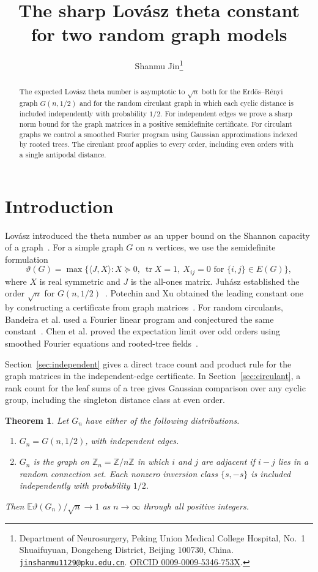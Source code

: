 \documentclass[11pt,letterpaper]{article}
\title{The sharp Lov\'asz theta constant for two random graph models}
\author{Shanmu Jin\thanks{Department of Neurosurgery, Peking Union Medical College
  Hospital, No.~1 Shuaifuyuan, Dongcheng District, Beijing
  100730, China.
  \href{mailto:jinshanmu1129@pku.edu.cn}{\nolinkurl{jinshanmu1129@pku.edu.cn}}.
  \href{https://orcid.org/0009-0009-5346-753X}{ORCID 0009-0009-5346-753X}.}}
\date{}
\newtheorem{theorem}{Theorem}
\newcommand{\E}{\mathbb E}
\newcommand{\Z}{\mathbb Z}
\newcommand{\tr}{\operatorname{tr}}
\begin{document}
\maketitle

\begin{abstract}
The expected Lov\'asz theta number is asymptotic to \(\sqrt n\) both for the
Erd\H{o}s--R\'enyi graph \(G(n,1/2)\) and for the random circulant graph in
which each cyclic distance is included independently with probability
\(1/2\). For independent edges we prove a sharp norm bound for the graph
matrices in a positive semidefinite certificate. For circulant graphs we
control a smoothed Fourier program using Gaussian approximations indexed
by rooted trees. The circulant proof applies to every order, including
even orders with a single antipodal distance.
\end{abstract}

\section{Introduction}

Lov\'asz introduced the theta number as an upper bound on the Shannon
capacity of a graph~\cite{Lovasz}. For a simple graph \(G\) on \(n\)
vertices, we use the semidefinite formulation
\begin{equation}\label{eq:theta}
 \vartheta(G)=\max\{\langle J,X\rangle : X\succeq0,\ \tr X=1,\
        X_{ij}=0\text{ for }\{i,j\}\in E(G)\},
\end{equation}
where \(X\) is real symmetric and \(J\) is the all-ones matrix.
Juh\'asz established the order \(\sqrt n\) for \(G(n,1/2)\)~\cite{Juhasz}.
Potechin and Xu obtained the leading constant one by constructing a
certificate from graph matrices~\cite{PX}. For random circulants,
Bandeira et al. used a Fourier linear program and
conjectured the same constant~\cite{BBDFKK}. Chen et al. proved the
expectation limit over odd orders using smoothed Fourier equations and
rooted-tree fields~\cite{CHHWY}.

Section~\ref{sec:independent} gives a direct trace count and product rule
for the graph matrices in the independent-edge certificate. In
Section~\ref{sec:circulant}, a rank count for the leaf sums of a tree gives
Gaussian comparison over any cyclic group, including the singleton
distance class at even order.

\begin{theorem}\label{thm:main}
Let \(G_n\) have either of the following distributions.
\begin{enumerate}
\item \(G_n=G(n,1/2)\), with independent edges.
\item \(G_n\) is the graph on \(\Z_n=\Z/n\Z\) in which \(i\) and \(j\)
are adjacent if \(i-j\) lies in a random connection set. Each nonzero
inversion class \(\{s,-s\}\) is included independently with probability
\(1/2\).
\end{enumerate}
Then \(\E\vartheta(G_n)/\sqrt n\to 1\) as \(n\to\infty\) through all
positive integers.
\end{theorem}
\end{document}
